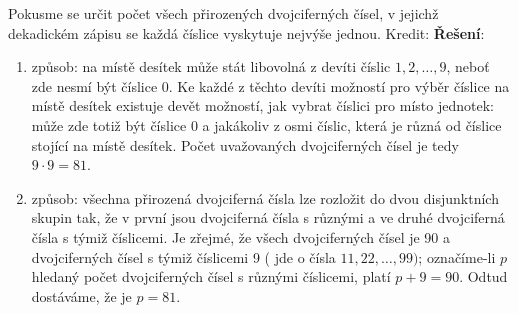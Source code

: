 \begin{mdframed}[style=mdexam]
  \begin{example}\label{mai:exam094}
    Pokusme se určit počet všech přirozených dvojciferných čísel, v jejichž dekadickém zápisu se
    každá číslice vyskytuje nejvýše jednou. Kredit: \cite[s.~8]{calda2008matematika} \newline
    \textbf{Řešení}:
    \begin{enumerate}[noitemsep]
      \item způsob: na místě desítek může stát libovolná z devíti číslic \(1, 2, \ldots, 9\), neboť
            zde nesmí být číslice 0. Ke každé z těchto devíti možností pro výběr číslice na místě
            desítek existuje devět možností, jak vybrat číslici pro místo jednotek: může zde totiž
            být číslice 0 a jakákoliv z osmi číslic, která je různá od číslice stojící na místě
            desítek. Počet uvažovaných dvojciferných čísel je tedy \(9\cdot9 = 81\).
      \item způsob: všechna přirozená dvojciferná čísla lze rozložit do dvou disjunktních skupin
            tak, že v první jsou dvojciferná čísla s různými a ve druhé dvojciferná čísla s týmiž
            číslicemi. Je zřejmé, že všech dvojciferných čísel je 90 a dvojciferných čísel s týmiž
            číslicemi 9 ( jde o čísla \(11, 22, \ldots, 99)\); označíme-li \(p\) hledaný počet
            dvojciferných čísel s různými číslicemi, platí \(p+9 = 90\). Odtud dostáváme, že je
            \(p=81\).      
    \end{enumerate}
  \end{example}
\end{mdframed}
